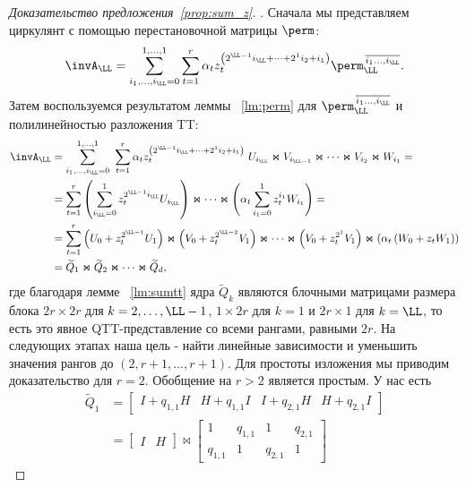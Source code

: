 \begin{proof}[Доказательство предложения~\ref{prop:sum_z}].
	Сначала мы представляем циркулянт с помощью перестановочной матрицы $\perm$:
	\[
	\invA_\LL = \sum_{i_1,\dots,i_\LL=0}^{1,\dots,1} \sum_{t=1}^r \alpha_t z_t^{\left(2^{\LL-1}i_{\LL} + \dots + 2^1 i_2 + i_1\right)} \perm_\LL^{\,\overline{i_1\dots, i_\LL}}.
	\]
	Затем воспользуемся результатом леммы ~\ref{lm:perm} для $\perm_\LL^{\,\overline{i_1\dots, i_\LL}}$ и полилинейностью разложения TT:
	\[
	\begin{split}
	\invA_\LL 
	&= \sum_{i_1,\dots,i_\LL=0}^{1,\dots,1}\ \sum_{t=1}^r
	\alpha_t
	z_t^{\left(2^{\LL-1}i_{\LL} + \dots + 2^1 i_2 + i_1\right)} \ U_{i_\LL} \Join V_{i_{\LL-1}} \Join \dots \Join V_{i_{2}} \Join W_{i_1}  
	= \\
	&=
	\sum_{t=1}^r \left( \sum_{i_\LL=0}^1 z_t^{2^{\LL-1}i_{\LL}} U_{i_\LL}  \right)
	\Join 
	\dots
	\Join 
	\left( \alpha_t \sum_{i_1=0}^1 z_t^{i_{1}} W_{i_1} \right) = \\
	&=
	\sum_{t=1}^r \left(U_0 + z_t^{2^{\LL-1}} U_1 \right) \Join \left(V_0 + z_t^{2^{\LL-2}} V_1 \right) \Join \dots \Join \left(V_0 + z_t^{2^{1}} V_1 \right) \Join \left(\alpha_t \left(W_0 + z_t W_1 \right) \right) \\
	&=
	{\widetilde Q}_1 \Join {\widetilde Q}_2 \Join \dots \Join {\widetilde Q}_d,
	\end{split}
	\]
	где благодаря лемме ~\ref{lm:sumtt} ядра ${\widetilde Q}_k$ являются блочными матрицами размера блока $2r \times 2r$ для $k=2,\dots,\LL-1$, $1\times 2r$ для $k=1$ и $2r\times 1$ для $k=\LL$, то есть это явное QTT-представление со всеми рангами, равными $2r$.
	На следующих этапах наша цель - найти линейные зависимости и уменьшить значения рангов до $(2, r+1, \dots, r+1)$.
	Для простоты изложения мы приводим доказательство для $r=2$. Обобщение на $r>2$ является простым.
	У нас есть
	\[
	\begin{split}
	{\widetilde Q}_1
	&= 
	\begin{bmatrix}
	I + q_{1,1} H & H + q_{1,1} I & I + q_{2,1} H & H + q_{2,1} I
	\end{bmatrix}
	\\
	&= 
	\begin{bmatrix}
	I & H
	\end{bmatrix}
	\Join
	\begin{bmatrix}
	1 & q_{1,1} & 1 & q_{2,1} \\
	q_{1,1} & 1 & q_{2,1} & 1
	\end{bmatrix}
	\end{split}
\]
\end{proof}
